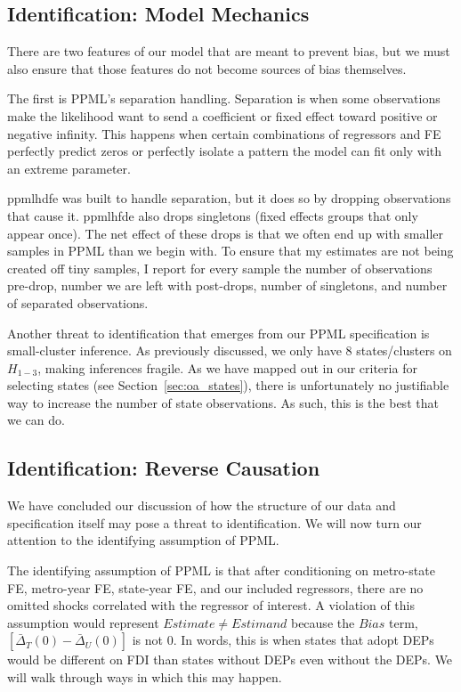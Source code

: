 \documentclass[12pt]{article}
\let\oldsubsection\subsection
\renewcommand{\subsection}{\FloatBarrier\oldsubsection}
\begin{document}
\subsection{Identification: Model Mechanics } \label{ss: model mechanics}

There are two features of our model that are meant to prevent bias, but we must also ensure that those features do not become sources of bias themselves.

The first is PPML's separation handling. Separation is when some observations make the likelihood want to send a coefficient or fixed effect toward positive or negative infinity. This happens when certain combinations of regressors and FE perfectly predict zeros or perfectly isolate a pattern the model can fit only with an extreme parameter. 

ppmlhdfe was built to handle separation, but it does so by dropping observations that cause it. ppmlhfde also drops singletons (fixed effects groups that only appear once). The net effect of these drops is that we often end up with smaller samples in PPML than we begin with. To ensure that my estimates are not being created off tiny samples, I report for every sample the number of observations pre-drop, number we are left with post-drops, number of singletons, and number of separated observations.

Another threat to identification that emerges from our PPML specification is small-cluster inference. As previously discussed, we only have 8 states/clusters on $H_{1-3}$, making inferences fragile. As we have mapped out in our criteria for selecting states (see Section~\ref{sec:oa_states}), there is unfortunately no justifiable way to increase the number of state observations. As such, this is the best that we can do.

\subsection{Identification: Reverse Causation} \label{ss:logical threats}

We have concluded our discussion of how the structure of our data and specification itself may pose a threat to identification. We will now turn our attention to the identifying assumption of PPML.

The identifying assumption of PPML is that after conditioning on metro-state FE, metro-year FE, state-year FE, and our included regressors, there are no omitted shocks correlated with the regressor of interest. A violation of this assumption would represent $Estimate \neq Estimand$ because the $Bias$ term,  $\left[\bar{\Delta}_T(0)-\bar{\Delta}_U(0)\right]$ is not 0. In words, this is when states that adopt DEPs would be different on FDI than states without DEPs even without the DEPs. We will walk through ways in which this may happen.
\end{document}
